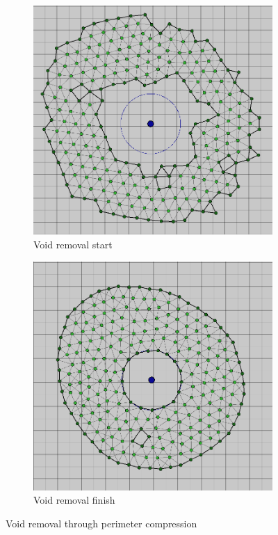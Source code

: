 \documentclass[12pt,a4paper]{IEEEtran}
\begin{document}
\begin{figure}
\centering
\begin{subfigure}{.4\textwidth}
	\centering	
	\includegraphics[width=1.0\linewidth]{figures/voidRemoval1}
	\caption[Void removal start]{Void removal start}
	\label{fig:voidRemovalStart}
\end{subfigure}
\begin{subfigure}{.4\textwidth}
	\centering
	\includegraphics[width=1.0\linewidth]{figures/voidRemoval2}
	\caption[Void removal finish]{Void removal finish}
	\label{fig:voidRemovalFinish}
\end{subfigure}
\caption{Void removal through perimeter compression}
\label{fig:voidRemoval}
\end{figure}
\end{document}
